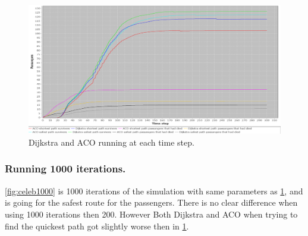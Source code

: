 


\begin{figure} [h]
\centering
\hspace*{-1.0in}
\includegraphics[scale=0.35]{images/Graph-using-200-rounds-140-passangers-and-one-fire.png}
\caption{Dijkstra and ACO running at each time step.}
\label{fig:celeb}
\end{figure}

\subsubsection{Running 1000 iterations.}
\ref{fig:celeb1000} is 1000 iterations of the simulation with same parameters as \ref{fig:celeb}, and is going for the safest route for the passengers. There is no clear difference when using 1000 iterations then 200. However Both Dijkstra and ACO when trying to find the quickest path got slightly worse then in \ref{fig:celeb}.

